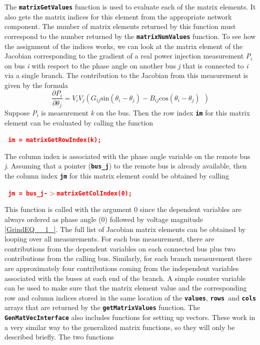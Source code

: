 \documentclass[12pt]{report} %
\begin{document}
The \texttt{\textbf{matrixGetValues}} function is used to evaluate each of the matrix elements. It also gets the matrix indices for this element from the appropriate network component. The number of matrix elements returned by this function must correspond to the number returned by the \texttt{\textbf{matrixNumValues}} function. To see how the assignment of the indices works, we can look at the matrix element of the Jacobian corresponding to the gradient of a real power injection measurement \textit{P${}_{i}$} on bus \textit{i} with respect to the phase angle on another bus \textit{j} that is connected to \textit{i} via a single branch. The contribution to the Jacobian from this measurement is given by the formula\[\frac{\partial P_i}{\partial {\theta }_j}=V_iV_j(G_{ij}{\mathrm{sin} \left({\theta }_i-{\theta }_j\right)-B_{ij}{\mathrm{cos} ({\theta }_i-{\theta }_j)\ }\ })\] 
Suppose \textit{P${}_{i}$} is measurement \textit{k} on the bus. Then the row index \texttt{\textbf{im}} for this matrix element can be evaluated by calling the function

\textcolor{red}{\texttt{\textbf{                im = matrixGetRowIndex(k);}}}

The column index is associated with the phase angle variable on the remote bus \textit{j}. Assuming that a pointer (\texttt{\textbf{bus\_j}}) to the remote bus is already available, then the column index \texttt{\textbf{jm}} for this matrix element could be obtained by calling

\textcolor{red}{\texttt{\textbf{                jm = bus\_j-$\boldsymbol{\mathrm{>}}$matrixGetColIndex(0);}}}

This function is called with the argument 0 since the dependent variables are always ordered as phase angle (0) followed by voltage magnitude \eqref{GrindEQ__1_}. The full list of Jacobian matrix elements can be obtained by looping over all measurements. For each bus measurement, there are contributions from the dependent variables on each connected bus plus two contributions from the calling bus. Similarly, for each branch measurement there are approximately four contributions coming from the independent variables associated with the buses at each end of the branch. A simple counter variable can be used to make sure that the matrix element value and the corresponding row and column indices stored in the same location of the \texttt{\textbf{values}}, \texttt{\textbf{rows }}and \texttt{\textbf{cols}} arrays that are returned by the \texttt{\textbf{getMatrixValues}} function.
The \texttt{\textbf{GenMatVecInterface}} also includes functions for setting up vectors. These work in a very similar way to the generalized matrix functions, so they will only be described briefly. The two functions
\end{document}
